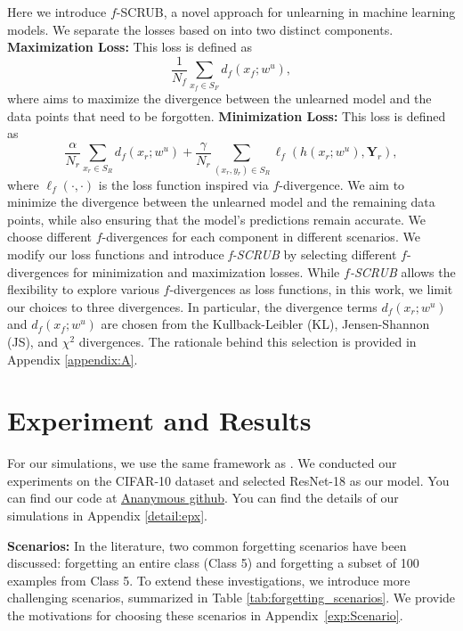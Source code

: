 \documentclass{article} %
\begin{document}
Here we introduce \texorpdfstring{$f$}{f}-SCRUB, a novel approach for unlearning in machine learning models. We separate the losses based on \citep{kurmanji2023unboundedmachineunlearning} into two distinct components. 
\newline \textbf{Maximization Loss:} This loss is defined as 
\[\frac{1}{N_f} \sum_{x_f \in S_F} d_f(x_f; w^u),\] where aims to maximize the divergence between the unlearned model and the data points that need to be forgotten. 
\newline \textbf{Minimization Loss:} This loss is defined as 
\[\frac{\alpha}{N_r} \sum_{x_r \in S_R} d_f(x_r; w^u) + \frac{\gamma}{N_r} \sum_{(x_r, y_r) \in S_R} \ell_f(h(x_r; w^u), \mathbf{Y}_r),\] where $\ell_f(\cdot,\cdot)$ is the loss function inspired via $f$-divergence. We aim to minimize the divergence between the unlearned model and the remaining data points, while also ensuring that the model's predictions remain accurate. 
\newline We choose different \texorpdfstring{$f$}{f}-divergences for each component in different scenarios.
We modify our loss functions and introduce \textit{f-SCRUB} by selecting different $f$-divergences for minimization and maximization losses.  While \textit{$f$-SCRUB} allows the flexibility to explore various $f$-divergences as loss functions, in this work, we limit our choices to three divergences. In particular, the divergence terms $d_f(x_r; w^u)$ and $d_f(x_f; w^u)$ are chosen from the Kullback-Leibler (KL), Jensen-Shannon (JS), and $\chi^2$ divergences. The rationale behind this selection is provided in Appendix \ref{appendix:A}.
\vspace{-0.1in}
\section{Experiment and Results}
\vspace{-0.1in}
For our simulations, we use the same framework as \citep{kurmanji2023unboundedmachineunlearning}. We conducted our experiments on the CIFAR-10 dataset and selected ResNet-18 as our model. You can find our code at  \href{https://anonymous.4open.science/r/F-Scrube-8DEC/README.md}{Ananymous github}. You can find the details of our simulations in Appendix \ref{detail:epx}.

\textbf{Scenarios:} In the literature, two common forgetting scenarios have been discussed: forgetting an entire class (Class 5) and forgetting a subset of 100 examples from Class 5. To extend these investigations, we introduce more challenging scenarios, summarized in Table \ref{tab:forgetting_scenarios}. We provide the motivations for choosing these scenarios in Appendix~\ref{exp:Scenario}.
\end{document}
